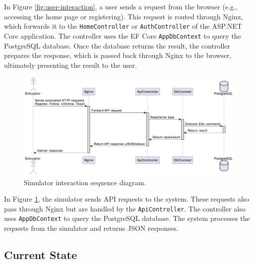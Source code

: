 \documentclass[12pt,a4paper,reqno]{report}
\begin{document}
In Figure \ref{fig:user-interaction}, a user sends a request from the browser (e.g., accessing the home page or registering). This request is routed through Nginx, which forwards it to the \texttt{HomeController} or \texttt{AuthController} of the ASP.NET Core application. The controller uses the EF Core \texttt{AppDbContext} to query the PostgreSQL database. Once the database returns the result, the controller prepares the response, which is passed back through Nginx to the browser, ultimately presenting the result to the user.

\begin{figure}[H]
    \centering
    \includegraphics[width=\textwidth]{images/simulator-interaction-uml.png}
    \caption{Simulator interaction sequence diagram.}
    \label{fig:simulator-interaction}
\end{figure}

In Figure \ref{fig:simulator-interaction}, the simulator sends API requests to the system. These requests also pass through Nginx but are handled by the \texttt{ApiController}. The controller also uses \texttt{AppDbContext} to query the PostgreSQL database. The system processes the requests from the simulator and returns JSON responses.



\subsection{Current State}
\end{document}
